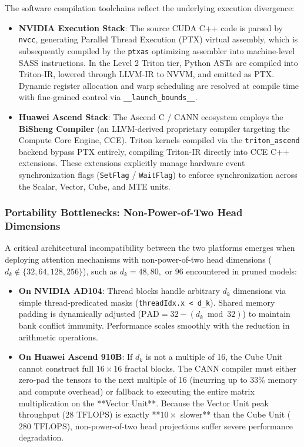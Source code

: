 The software compilation toolchains reflect the underlying execution divergence:
\begin{itemize}
    \item \textbf{NVIDIA Execution Stack}: The source CUDA C++ code is parsed by \texttt{nvcc}, generating Parallel Thread Execution (PTX) virtual assembly, which is subsequently compiled by the \texttt{ptxas} optimizing assembler into machine-level SASS instructions. In the Level 2 Triton tier, Python ASTs are compiled into Triton-IR, lowered through LLVM-IR to NVVM, and emitted as PTX. Dynamic register allocation and warp scheduling are resolved at compile time with fine-grained control via \texttt{\_\_launch\_bounds\_\_}.
    \item \textbf{Huawei Ascend Stack}: The Ascend C / CANN ecosystem employs the \textbf{BiSheng Compiler} (an LLVM-derived proprietary compiler targeting the Compute Core Engine, CCE). Triton kernels compiled via the \texttt{triton\_ascend} backend bypass PTX entirely, compiling Triton-IR directly into CCE C++ extensions. These extensions explicitly manage hardware event synchronization flags (\texttt{SetFlag} / \texttt{WaitFlag}) to enforce synchronization across the Scalar, Vector, Cube, and MTE units.
\end{itemize}

\subsubsection{Portability Bottlenecks: Non-Power-of-Two Head Dimensions}
\label{sec:appendix_portability_bottlenecks}

A critical architectural incompatibility between the two platforms emerges when deploying attention mechanisms with non-power-of-two head dimensions ($d_k \notin \{32, 64, 128, 256\}$), such as $d_k = 48, 80,$ or $96$ encountered in pruned models:
\begin{itemize}
    \item \textbf{On NVIDIA AD104}: Thread blocks handle arbitrary $d_k$ dimensions via simple thread-predicated masks (\texttt{threadIdx.x < d\_k}). Shared memory padding is dynamically adjusted ($\text{PAD} = 32 - (d_k \bmod 32)$) to maintain bank conflict immunity. Performance scales smoothly with the reduction in arithmetic operations.
    \item \textbf{On Huawei Ascend 910B}: If $d_k$ is not a multiple of 16, the Cube Unit cannot construct full $16 \times 16$ fractal blocks. The CANN compiler must either zero-pad the tensors to the next multiple of 16 (incurring up to $33\%$ memory and compute overhead) or fallback to executing the entire matrix multiplication on the **Vector Unit**. Because the Vector Unit peak throughput ($28\text{ TFLOPS}$) is exactly **$10\times$ slower** than the Cube Unit ($280\text{ TFLOPS}$), non-power-of-two head projections suffer severe performance degradation.
\end{itemize}


